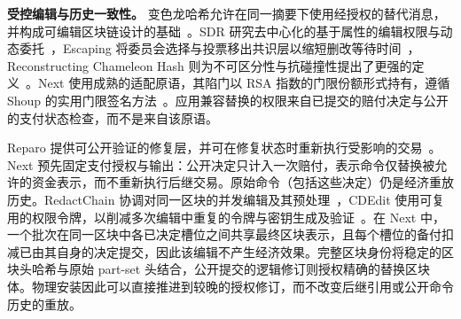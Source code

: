 \noindent\textbf{受控编辑与历史一致性。}
变色龙哈希允许在同一摘要下使用经授权的替代消息，并构成可编辑区块链设计的基础~\cite{redactable}。SDR 研究去中心化的基于属性的编辑权限与动态委托~\cite{sdr}，Escaping 将委员会选择与投票移出共识层以缩短删改等待时间~\cite{escaping}，Reconstructing Chameleon Hash 则为不可区分性与抗碰撞性提出了更强的定义~\cite{reconstructCH}。Next 使用成熟的适配原语，其陷门以 RSA 指数的门限份额形式持有，遵循 Shoup 的实用门限签名方法~\cite{shoup}。应用兼容替换的权限来自已提交的赔付决定与公开的支付状态检查，而不是来自该原语。

Reparo 提供可公开验证的修复层，并可在修复状态时重新执行受影响的交易~\cite{reparo}。Next 预先固定支付授权与输出：公开决定只计入一次赔付，表示命令仅替换被允许的资金表示，而不重新执行后继交易。原始命令（包括这些决定）仍是经济重放历史。RedactChain 协调对同一区块的并发编辑及其预处理~\cite{redactchain}，CDEdit 使用可复用的权限令牌，以削减多次编辑中重复的令牌与密钥生成及验证~\cite{cdedit}。在 Next 中，一个批次在同一区块中各已决定槽位之间共享最终区块表示，且每个槽位的备付扣减已由其自身的决定提交，因此该编辑不产生经济效果。完整区块身份将稳定的区块头哈希与原始 part-set 头结合，公开提交的逻辑修订则授权精确的替换区块体。物理安装因此可以直接推进到较晚的授权修订，而不改变后继引用或公开命令历史的重放。
